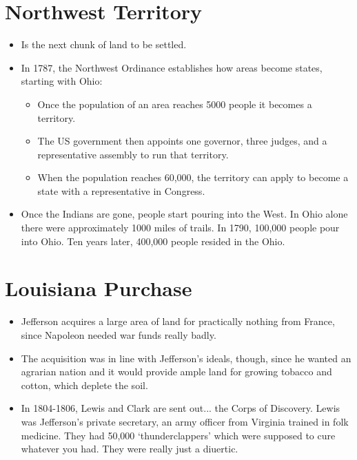 \documentclass{article}
\begin{document}
\section{Northwest Territory}
  \begin{itemize}
    \item Is the next chunk of land to be settled.
    \item In 1787, the Northwest Ordinance establishes how areas become states, starting with Ohio:
      \begin{itemize}
        \item Once the population of an area reaches 5000 people it becomes a territory.
        \item The US government then appoints one governor, three judges, and a representative assembly to run that territory.
        \item When the population reaches 60,000, the territory can apply to become a state with a representative in Congress.
      \end{itemize}
    \item Once the Indians are gone, people start pouring into the West. In Ohio alone there were approximately 1000 miles of trails. In 1790, 100,000 people pour into Ohio. Ten years later, 400,000 people resided in the Ohio.
  \end{itemize}

\section{Louisiana Purchase}
  \begin{itemize}
    \item Jefferson acquires a large area of land for practically nothing from France, since Napoleon needed war funds really badly.
    \item The acquisition was in line with Jefferson's ideals, though, since he wanted an agrarian nation and it would provide ample land for growing tobacco and cotton, which deplete the soil.
    \item In 1804-1806, Lewis and Clark are sent out... the Corps of Discovery. Lewis was Jefferson's private secretary, an army officer from Virginia trained in folk medicine. They had 50,000 `thunderclappers' which were supposed to cure whatever you had. They were really just a diuertic.
  \end{itemize}
\end{document}
